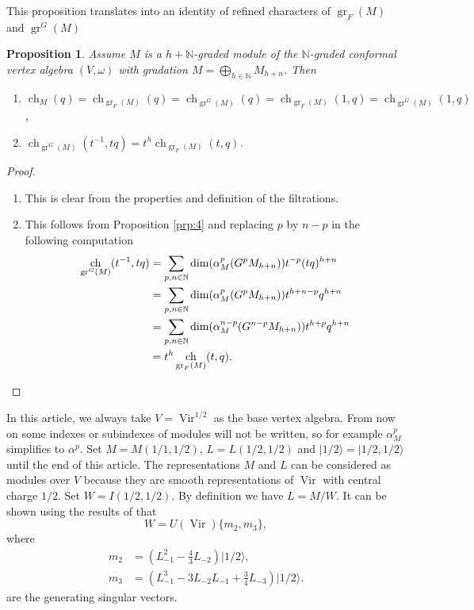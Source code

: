 \documentclass[12pt,a4paper]{article}
\newtheorem{proposition}{Proposition}
\DeclareMathOperator{\Vir}{Vir}
\DeclareMathOperator{\gr}{gr}
\DeclareMathOperator{\ch}{ch}
\newcommand{\vachalf}{|1/2\rangle}
\begin{document}
This proposition translates into an identity of refined characters of $\gr_F(M)$ and $\gr^G(M)$
\begin{proposition}
  \label{prp:5}
  Assume $M$ is a $h+\mathbb{N}$-graded module of the $\mathbb{N}$-graded conformal vertex algebra $(V,\omega)$ with gradation $M=\bigoplus_{h\in \mathbb{N}}M_{h+n}$.
  Then
  \begin{enumerate}[label={(\alph*)}]
  \item $\ch_M(q)=\ch_{\gr_F(M)}(q)=\ch_{\gr^G(M)}(q)=\ch_{\gr_F(M)}(1,q)=\ch_{\gr^G(M)}(1,q)$,
  \item $\ch_{\gr^G(M)}(t^{-1},tq)=t^h\ch_{\gr_F(M)}(t,q)$.
  \end{enumerate}
\end{proposition}
\begin{proof}
  \begin{enumerate}[label={(\alph*)}]
  \item This is clear from the properties and definition of the filtrations.
  \item This follows from Proposition \ref{prp:4} and replacing $p$ by $n-p$ in the following computation
    \begin{align*}
    \ch_{\gr^G(M)}(t^{-1},tq)&=\sum_{p,n\in \mathbb{N}}\dim(\alpha^p_M(G^pM_{h+n}))t^{-p}(tq)^{h+n} \\
    &=\sum_{p,n\in \mathbb{N}}\dim(\alpha^p_M(G^pM_{h+n}))t^{h+n-p}q^{h+n} \\
    &=\sum_{p,n\in \mathbb{N}}\dim(\alpha^{n-p}_M(G^{n-p}M_{h+n}))t^{h+p}q^{h+n} \\
    &=t^h\ch_{\gr_F(M)}(t,q).\qedhere
  \end{align*}
  \end{enumerate}
\end{proof}

In this article, we always take $V=\Vir^{1/2}$ as the base vertex algebra.
From now on some indexes or subindexes of modules will not be written, so for example $\alpha^p_M$ simplifies to $\alpha^p$.
Set $M=M(1/1,1/2)$, $L=L(1/2,1/2)$ and $\vachalf=|1/2,1/2\rangle$ until the end of this article.
The representations $M$ and $L$ can be considered as modules over $V$ because they are smooth representations of $\Vir$ with central charge $1/2$.
Set $W=I(1/2,1/2)$.
By definition we have $L=M/W$.
It can be shown using the results of \cite{feigin_verma_1984} that
\begin{equation*}
  W=U(\Vir)\{m_2,m_3\},
\end{equation*}
where
\begin{align*}
  m_2&= \left(L_{-1}^2-\tfrac{4}{3}L_{-2}\right)\vachalf, \\
  m_3&= \left(L_{-1}^3-3L_{-2}L_{-1}+\tfrac{3}{4}L_{-3}\right)\vachalf.
\end{align*}
are the generating singular vectors.
\end{document}
